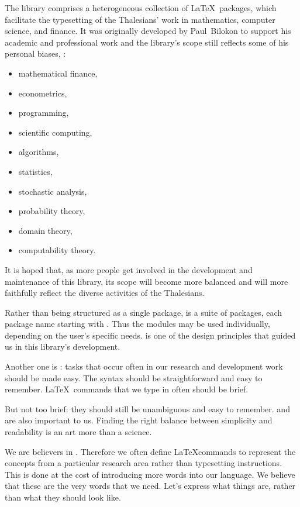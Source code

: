 The \LaThalesians library comprises a heterogeneous collection of \LaTeX~packages, which facilitate the typesetting of the Thalesians' work in mathematics, computer science, and finance. It was originally developed by Paul~Bilokon to support his academic and professional work and the library's scope still reflects some of his personal biases, \viz:
\begin{itemize}
\item mathematical finance,
\item econometrics,
\item programming,
\item scientific computing,
\item algorithms,
\item statistics,
\item stochastic analysis,
\item probability theory,
\item domain theory,
\item computability theory.
\end{itemize}

It is hoped that, as more people get involved in the development and maintenance of this library, its scope will become more balanced and will more faithfully reflect the diverse activities of the Thalesians.

Rather than being structured as a single package, \LaThalesians is a suite of packages, each package name starting with . Thus the modules may be used individually, depending on the user's specific needs.  is one of the design principles that guided us in this library's development.

Another one is : tasks that occur often in our research and development work should be made easy. The syntax should be straightforward and easy to remember. \LaTeX~commands that we type in often should be brief.

But not too brief: they should still be unambiguous and easy to remember.  and  are also important to us. Finding the right balance between simplicity and readability is an art more than a science.

We are believers in . Therefore we often define \LaTeX commands to represent the concepts from a particular research area rather than typesetting instructions. This is done at the cost of introducing more words into our language. We believe that these are the very words that we need. Let's express what things are, rather than what they should look like.


